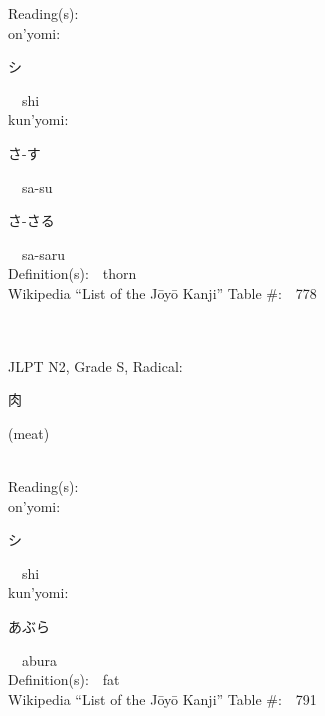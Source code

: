 \begin{multicols}{2}
Reading(s):\ \ \\
{\hspace*{1em}}on'yomi:\ \ \\
{\hspace*{2em}}{\begin{CJK}{UTF8}{min} シ \end{CJK}}\ \ shi\ \ \\
{\hspace*{1em}}kun'yomi:\ \ \\
{\hspace*{2em}}{\begin{CJK}{UTF8}{min} さ-す \end{CJK}}\ \ sa-su\ \ \\
{\hspace*{2em}}{\begin{CJK}{UTF8}{min} さ-さる \end{CJK}}\ \ sa-saru\ \ \\
Definition(s):\ \ thorn \\
Wikipedia ``List of the J\=oy\=o Kanji'' Table \#:\ \ 778 \\
\ \ \\
{\fontsize{34pt}{40pt}  }\ \ \\  %
{JLPT N2, Grade S, Radical:\ \ {\begin{CJK}{UTF8}{min} 肉 \end{CJK}} (meat) } \\
Reading(s):\ \ \\
{\hspace*{1em}}on'yomi:\ \ \\
{\hspace*{2em}}{\begin{CJK}{UTF8}{min} シ \end{CJK}}\ \ shi\ \ \\
{\hspace*{1em}}kun'yomi:\ \ \\
{\hspace*{2em}}{\begin{CJK}{UTF8}{min} あぶら \end{CJK}}\ \ abura\ \ \\
Definition(s):\ \ fat \\
Wikipedia ``List of the J\=oy\=o Kanji'' Table \#:\ \ 791 \\
\ \ \\

\end{multicols}
